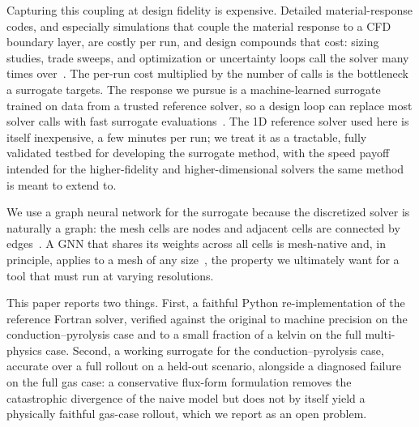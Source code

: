 \documentclass[conference]{IEEEtran}
\begin{document}
Capturing this coupling at design fidelity is expensive. Detailed
material-response codes, and especially simulations that couple the material
response to a CFD boundary layer, are costly per run, and design compounds that
cost: sizing studies, trade sweeps, and optimization or uncertainty loops call the
solver many times over~\cite{pan2023,mazzaracchio2010,lu2024}. The per-run cost
multiplied by the number of calls is the bottleneck a surrogate targets. The
response we pursue is a machine-learned surrogate trained on data from a trusted
reference solver, so a design loop can replace most solver calls with fast
surrogate evaluations~\cite{queipo2005}. The 1D reference solver used here is
itself inexpensive, a few minutes per run; we treat it as a tractable, fully
validated testbed for developing the surrogate method, with the speed payoff
intended for the higher-fidelity and higher-dimensional solvers the same method is
meant to extend to.

We use a graph neural network for the surrogate because the discretized solver is
naturally a graph: the mesh cells are nodes and adjacent cells are connected by
edges~\cite{sanchez2020learning}. A GNN that shares its weights across all cells
is mesh-native and, in principle, applies to a mesh of any
size~\cite{meshgraphnets}, the property we ultimately want for a tool that must
run at varying resolutions.

This paper reports two things. First, a faithful Python re-implementation of the
reference Fortran solver, verified against the original to machine precision on
the conduction--pyrolysis case and to a small fraction of a kelvin on the full
multi-physics case. Second, a working surrogate for the conduction--pyrolysis
case, accurate over a full rollout on a held-out scenario, alongside a diagnosed
failure on the full gas case: a conservative flux-form formulation removes the
catastrophic divergence of the naive model but does not by itself yield a
physically faithful gas-case rollout, which we report as an open problem.
\end{document}
